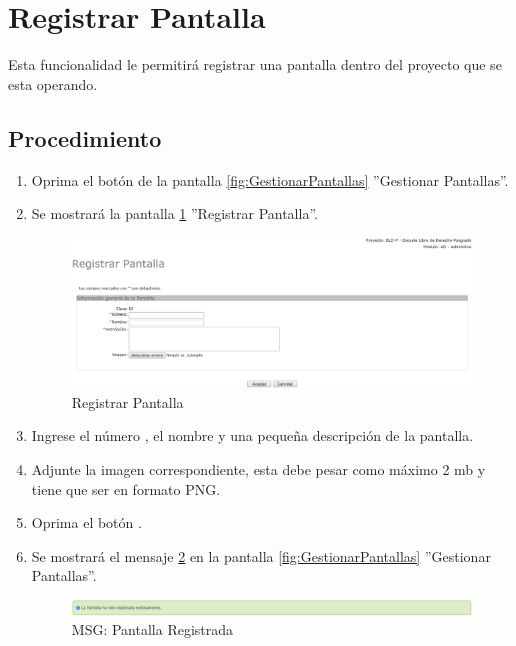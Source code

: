 
\hypertarget{cv:registrarPantalla}{\section{Registrar Pantalla}} \label{sec:registrarPantalla}

	Esta funcionalidad le permitirá registrar una pantalla dentro del proyecto que se esta operando. 

		\subsection{Procedimiento}

			\begin{enumerate}
	
			\item Oprima el botón \IURegistrar{} de la pantalla \ref{fig:GestionarPantallas} ''Gestionar Pantallas''.
			
			\item Se mostrará la pantalla \ref{fig:registrarPantalla} ''Registrar Pantalla''.

			\begin{figure}[H]
				\begin{center}
					\includegraphics[scale=0.5]{roles/lider/pantallas/pantallas/IU11-1resgitrarPantalla}
					\caption{Registrar Pantalla}
					\label{fig:registrarPantalla}
				\end{center}
			\end{figure}
		
			\item Ingrese el número , el nombre y una pequeña descripción de la pantalla.
			
			\item Adjunte la imagen correspondiente, esta debe pesar como máximo 2 mb y tiene que ser en formato PNG.
			
			\item Oprima el botón \IUAceptar.
			
			\item Se mostrará el mensaje \ref{fig:pantallaRegistrada} en la pantalla \ref{fig:GestionarPantallas} ''Gestionar Pantallas''.
			
			\begin{figure}[htbp!]
				\begin{center}
					\includegraphics[scale=0.5]{roles/lider/pantallas/pantallas/IU11-1MSG1}
					\caption{MSG: Pantalla Registrada}
					\label{fig:pantallaRegistrada}
				\end{center}
			\end{figure}
			\end{enumerate}